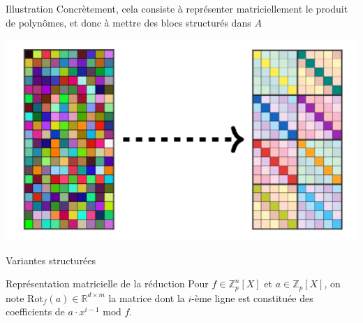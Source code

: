 \documentclass[10 pt, a4paper]{beamer}
\begin{document}
\begin{frame}{Illustration}
Concrètement, cela consiste à représenter matriciellement le produit de polynômes, et donc à mettre des blocs structurés dans $A$
\begin{center}
\includegraphics[scale=0.30]{plwe_struct.png}
\end{center}
\end{frame}

\begin{frame}{Variantes structurées}

\end{frame}

\begin{frame}{Représentation matricielle de la réduction}
Pour $f \in \mathbb{Z}^n_p[X]$ et $a \in \mathbb{Z}_p[X]$, on note $\text{Rot}_f(a) \in \mathbb{R}^{d\times m}$ la matrice dont la $i$-ème ligne est constituée des coefficients de $a\cdot x^{i-1}\text{ mod } f$.
\end{frame}
\end{document}
